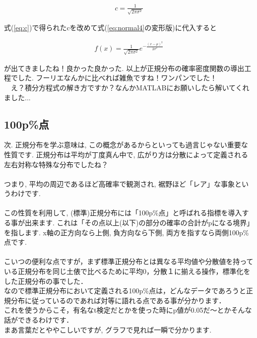 \documentclass[11pt,a4paper]{ujreport} 	%
\begin{document}
\begin{align}
\label{eq:c}
c = \frac{1}{\sqrt{2\pi\sigma^2}}
\end{align}

式(\ref{eq:c})で得られたcを改めて式(\ref{eq:normal4}の変形版)に代入すると

\begin{align}
f(x) = \frac{1}{\sqrt{2\pi\sigma^2}}e^{-\frac{(x-\mu)^2}{2\sigma^2}}
\end{align}

が出てきましたね！良かった良かった. 以上が正規分布の確率密度関数の導出工程でした. フーリエなんかに比べれば雑魚ですね！ワンパンでした！\\
　え？積分方程式の解き方ですか？なんかMATLABにお願いしたら解いてくれました...

\subsection{100p\%点}
次. 正規分布を学ぶ意味は, この概念があるからといっても過言じゃない重要な性質です. 正規分布は平均が丁度真ん中で, 広がり方は分散によって定義される左右対称な特殊な分布でしたね？\\\\

つまり, 平均の周辺であるほど高確率で観測され, 裾野ほど「レア」な事象というわけです.\\\\

この性質を利用して, (標準)正規分布には「100p\%点」と呼ばれる指標を導入する事が出来ます. これは「その点以上(以下)の部分の確率の合計がpになる境界」を指します. x軸の正方向なら上側, 負方向なら下側, 両方を指すなら両側100p\%点です. \\\\

こいつの便利な点ですが，まず標準正規分布とは異なる平均値や分散値を持っている正規分布を同じ土俵で比べるために平均0，分散１に揃える操作，標準化をした正規分布の事でした．\\

なので標準正規分布において定義される100p\%点は，どんなデータであろうと正規分布に従っているのであれば対等に語れる点である事が分かります．\\

これを使うからこそ，有名なt検定だとかを使った時にp値が0.05だ～とかそんな話ができるわけです．\\

まあ言葉だとややこしいですが, グラフで見れば一瞬で分かります.
\end{document}

